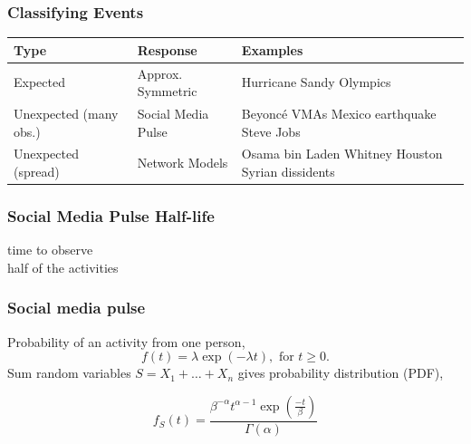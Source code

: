 \documentclass{beamer}
\begin{document}
\begin{frame}\frametitle{Classifying Events}
\begin{table}
\begin{tabular}{ m{2cm} | m{ 2.5cm} | m{4cm}}
\hline
Type & Response & Examples \\ \hline
Expected    & Approx. \newline Symmetric & Hurricane Sandy \newline Olympics \\ \hline
Unexpected (many obs.) & Social Media \newline Pulse & Beyonc\'{e} VMAs \newline  Mexico earthquake \newline  Steve Jobs \\ \hline
Unexpected (spread) & Network \newline Models & Osama bin Laden \newline  Whitney Houston \newline  Syrian dissidents \\ \hline
\end{tabular}
\end{table}
\end{frame}


\begin{frame}\frametitle{Social Media Pulse Half-life}
\begin{center}
{\Huge time to observe \\[10pt] half of the activities}
\end{center}
\end{frame}

\begin{frame}
\frametitle{Social media pulse} 
\Large{Probability of an activity from one person,
\begin{equation*}
f(t) = \lambda \exp(-\lambda t), \text{ for } t \geq 0.
\end{equation*}
Sum random variables $S = X_1 + \ldots + X_{n}$ gives probability distribution (PDF),

\begin{equation*}
f_S(t) = \frac{ \beta^{-\alpha} t^{\alpha-1} \exp( \frac{-t}{\beta}) } {\Gamma(\alpha)}
\end{equation*}

%
}
\end{frame}
\end{document}
